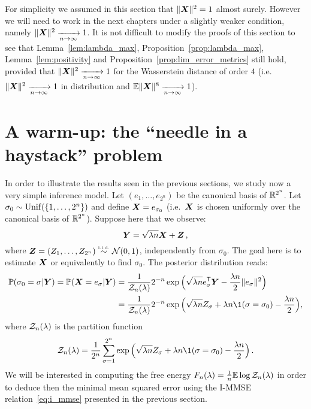 \documentclass[12pt,nocut]{article}
\begin{document}
\begin{remark}\label{rem:cosine}
For simplicity we assumed in this section that $\|{\boldsymbol X}\|^2 = 1$ almost surely. However we will need to work in the next chapters under a slightly weaker condition, namely $\|{\boldsymbol X}\|^2 \xrightarrow[n \to \infty]{} 1$. It is not difficult to modify the proofs of this section to see that Lemma~\ref{lem:lambda_max}, Proposition~\ref{prop:lambda_max}, Lemma~\ref{lem:positivity} and Proposition~\ref{prop:lim_error_metrics} still hold, provided that $\|{\boldsymbol X}\|^2 \xrightarrow[n \to \infty]{} 1$ for the Wasserstein distance of order $4$ (i.e.\ $\|{\boldsymbol X}\|^2 \xrightarrow[n \to \infty]{} 1$ in distribution and $\mathbb{E} \|{\boldsymbol X}\|^8 \xrightarrow[n \to \infty]{} 1$).
\end{remark}





\section{A warm-up: the ``needle in a haystack'' problem}\label{sec:rem}

In order to illustrate the results seen in the previous sections, we study now a very simple inference model.
Let $(e_1,\dots,e_{2^n})$ be the canonical basis of $\mathbb{R}^{2^n}$. Let $\sigma_0 \sim {\rm Unif}(\{1,\dots,2^n\})$ and define ${\boldsymbol X} = e_{\sigma_0}$ (i.e.\ ${\boldsymbol X}$ is chosen uniformly over the canonical basis of $\mathbb{R}^{2^n}$).
Suppose here that we observe:
$$
{\boldsymbol Y} = \sqrt{\lambda n} {\boldsymbol X} + {\boldsymbol Z} \,,
$$
where ${\boldsymbol Z} = (Z_1, \dots, Z_{2^n}) \overset{\text{\tiny i.i.d.}}{\sim} \mathcal{N}(0,1)$, independently from $\sigma_0$. The goal here is to estimate ${\boldsymbol X}$ or equivalently to find $\sigma_0$.
The posterior distribution reads:
\begin{align*}
\P(\sigma_0 = \sigma | \bbf{Y}) = 
\P(\bbf{X} = e_{\sigma} | \bbf{Y}) &= 
\frac{1}{\cZ_{n}(\lambda)} 2^{-n} \exp \Big( \sqrt{\lambda n} e_{\sigma}^{\sT} \bbf{Y} - \frac{\lambda n}{2} \|e_{\sigma}\|^2 \Big)
\\
&=
\frac{1}{\cZ_{n}(\lambda)} 2^{-n} \exp \Big( \sqrt{\lambda n}Z_{\sigma} + \lambda n \1(\sigma = \sigma_0) - \frac{\lambda n}{2} \Big) ,
\end{align*}
where $\mathcal{Z}_n(\lambda)$ is the partition function
$$
\cZ_{n}(\lambda) = \frac{1}{2^n} \sum_{\sigma=1}^{2^n} \exp \Big( \sqrt{\lambda n}Z_{\sigma} + \lambda n \1(\sigma = \sigma_0) - \frac{\lambda n}{2} \Big) \,.
$$
We will be interested in computing the free energy $F_n(\lambda) = \frac{1}{n} \mathbb{E} \log \mathcal{Z}_n(\lambda)$ in order to deduce then the minimal mean squared error using the I-MMSE relation~\eqref{eq:i_mmse} presented in the previous section. 
\end{document}
